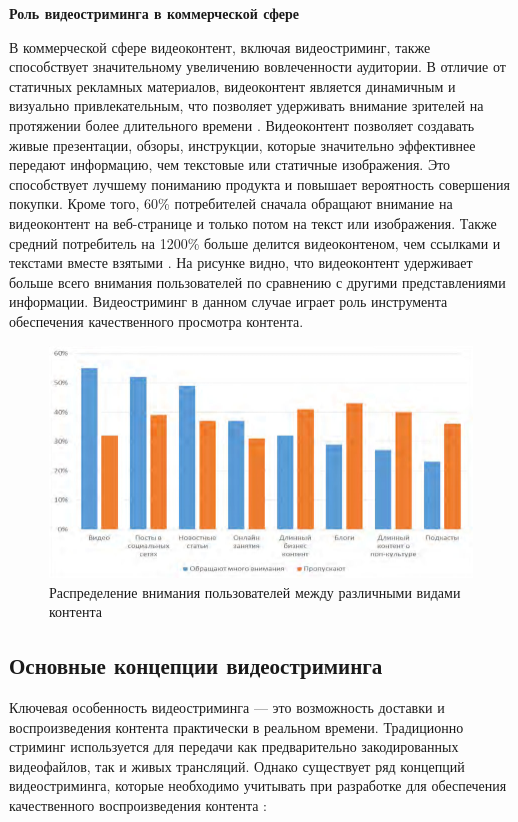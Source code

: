 \textbf{Роль видеостриминга в коммерческой сфере}

	В коммерческой сфере видеоконтент, включая видеостриминг, также способствует значительному увеличению вовлеченности аудитории. В отличие от статичных рекламных материалов, видеоконтент является динамичным и визуально привлекательным, что позволяет удерживать внимание зрителей на протяжении более длительного времени \cite{ilyinaVideoMarketing}. Видеоконтент позволяет создавать живые презентации, обзоры, инструкции, которые значительно эффективнее передают информацию, чем текстовые или статичные изображения. Это способствует лучшему пониманию продукта и повышает вероятность совершения покупки. Кроме того, 60\% потребителей сначала обращают внимание на видеоконтент на веб-странице и только потом на текст или изображения. Также средний потребитель на 1200\% больше делится видеоконтеном, чем ссылками и текстами вместе взятыми \cite{ilyinaVideoMarketing}. На рисунке видно, что видеоконтент удерживает больше всего внимания пользователей по сравнению с другими представлениями информации. Видеостриминг в данном случае играет роль инструмента обеспечения качественного просмотра контента.

	\begin{figure}[ht!] 
		\center
		\includegraphics [scale=0.5] {my_folder/images//content_distribution}
		\caption{Распределение внимания пользователей между различными видами контента \cite{ilyinaVideoMarketing}}
		\label{fig:content_distribution}  
	\end{figure}

\subsection{Основные концепции видеостриминга}
	Ключевая особенность видеостриминга — это возможность доставки и воспроизведения контента практически в реальном времени. Традиционно стриминг используется для передачи как предварительно закодированных видеофайлов, так и живых трансляций. Однако существует ряд концепций видеостриминга, которые необходимо учитывать при разработке для обеспечения качественного воспроизведения контента \cite{apostolopoulosVideoStreaming}:

